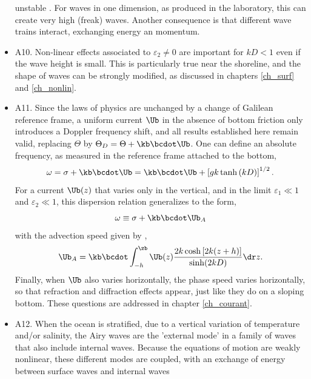 \begin{itemize}
unstable \citep{Benjamin&Feir1967}. For waves in one dimension, as produced in the laboratory, 
this can create very high (freak) waves. Another consequence is that different wave trains interact, 
exchanging energy an momentum.\vspace{0.3cm}
 \item A10. Non-linear effects associated to  $\varepsilon_2 \neq 0$ are important for $kD<1$ even if the wave height is small. 
This is particularly true near the shoreline, and the shape of waves can be strongly modified, as discussed in chapters \ref{ch_surf} and 
\ref{ch_nonlin}.\vspace{0.3cm}
 \item A11. Since the laws of physics are unchanged by a change of Galilean reference frame, 
a uniform current $\Ub$ in the absence of bottom friction only introduces a Doppler frequency shift, 
and all results established here remain valid, replacing 
$\Theta$ by $\Theta_D=\Theta+\kb \bcdot
 \Ub$. One can define an absolute frequency, as measured in the reference frame attached to the bottom, 
 \begin{equation}
    \omega=\sigma+\kb \bcdot \Ub =\kb \bcdot \Ub + \left[g k \tanh\left(kD\right)\right]^{1/2}.
     \label{dispersionD}
\end{equation}
For a current   $\Ub(z)$ that varies only in the vertical, and in the limit  $\varepsilon_1 \ll 1$  and $\varepsilon_2 \ll 1$, 
this dispersion relation generalizes to the form,
 \begin{equation}
    \omega\equiv\sigma+\kb \bcdot \Ub_A      \label{dispersionD2}
\end{equation}
with the advection speed given by \cite{Kirby&Chen1989}, 
 \begin{equation}
 \Ub_A   = \kb \bcdot \int_{-h}^{\zb} \Ub(z) \frac{2  k
\cosh\left[2k(z+h)\right]}{\sinh(2kD)} \dr z. \label{dispersionD3}
\end{equation}
Finally, when $\Ub$ also varies horizontally, the phase speed varies horizontally, so that refraction and diffraction effects 
appear, just like they do on a sloping bottom. These questions are addressed  in  chapter \ref{ch_courant}.\vspace{0.3cm}
\item A12. When the ocean is stratified, due to a vertical variation of temperature and/or salinity, the Airy waves are the 'external mode' in a family of waves that also include internal waves. 
Because the equations of motion are weakly nonlinear, these different modes are coupled, with an exchange of energy between surface waves and internal waves 

\end{itemize}
